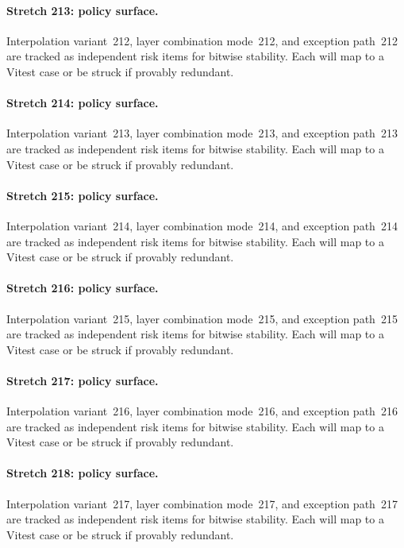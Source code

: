 \documentclass[sigconf,nonacm]{acmart}
\begin{document}
\paragraph{Stretch 213: policy surface.}
Interpolation variant~212, layer combination mode~212, and exception path~212 are tracked as independent risk items for bitwise stability. Each will map to a Vitest case or be struck if provably redundant. %

\paragraph{Stretch 214: policy surface.}
Interpolation variant~213, layer combination mode~213, and exception path~213 are tracked as independent risk items for bitwise stability. Each will map to a Vitest case or be struck if provably redundant. %

\paragraph{Stretch 215: policy surface.}
Interpolation variant~214, layer combination mode~214, and exception path~214 are tracked as independent risk items for bitwise stability. Each will map to a Vitest case or be struck if provably redundant. %

\paragraph{Stretch 216: policy surface.}
Interpolation variant~215, layer combination mode~215, and exception path~215 are tracked as independent risk items for bitwise stability. Each will map to a Vitest case or be struck if provably redundant. %

\paragraph{Stretch 217: policy surface.}
Interpolation variant~216, layer combination mode~216, and exception path~216 are tracked as independent risk items for bitwise stability. Each will map to a Vitest case or be struck if provably redundant. %

\paragraph{Stretch 218: policy surface.}
Interpolation variant~217, layer combination mode~217, and exception path~217 are tracked as independent risk items for bitwise stability. Each will map to a Vitest case or be struck if provably redundant. %
\end{document}
